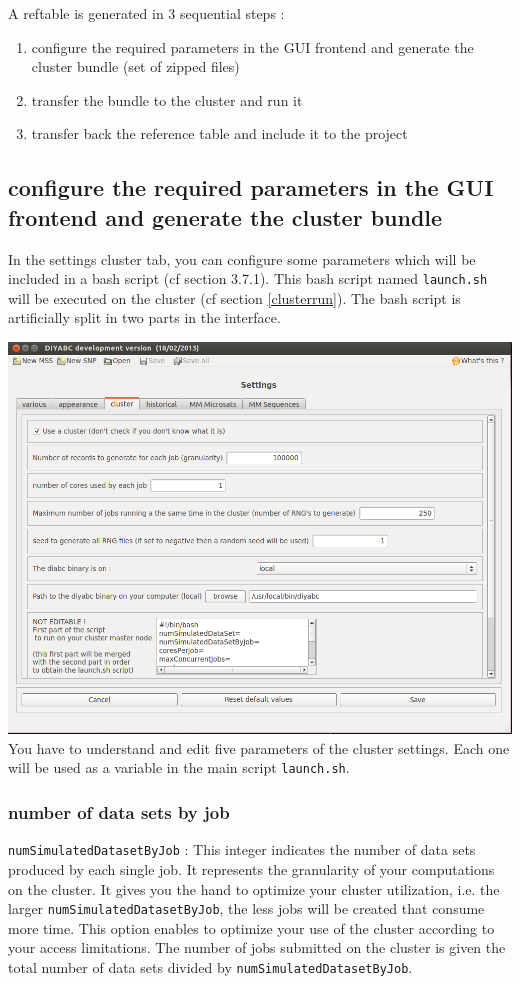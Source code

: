 A reftable is generated in 3 sequential steps :
\begin{enumerate}
 \item configure the required parameters in the GUI frontend and generate the cluster bundle (set of zipped files)
 \item transfer the bundle to the cluster and run it
 \item transfer back the reference table and include it to the project
\end{enumerate}

\subsection{configure the required parameters in the GUI frontend and generate the cluster bundle}\label{clusterconfigure}
In the settings cluster tab, you can configure some parameters which will be included in a bash script (cf section 3.7.1). This bash script named \texttt{launch.sh} will be executed on the cluster (cf section \ref{clusterrun}). The bash script is artificially split in two parts in the interface.

\includegraphics[scale=0.33]{gui_pictures/Capture-DIYABC-cluster.png} \\


You have to understand and edit five parameters of the cluster settings. Each one will be used as a variable in the main script \texttt{launch.sh}.
 

\subsubsection{number of data sets by job}
\texttt{numSimulatedDatasetByJob} : This integer indicates the number of data sets produced by each single job. It represents the granularity of your computations on the cluster. It gives you the hand to optimize your cluster utilization, i.e. the larger \texttt{numSimulatedDatasetByJob}, the less jobs will be created that consume more time. This option enables to optimize your use of the cluster according to your access limitations. The number of jobs submitted on the cluster is given the total number of data sets divided by \texttt{numSimulatedDatasetByJob}. 

